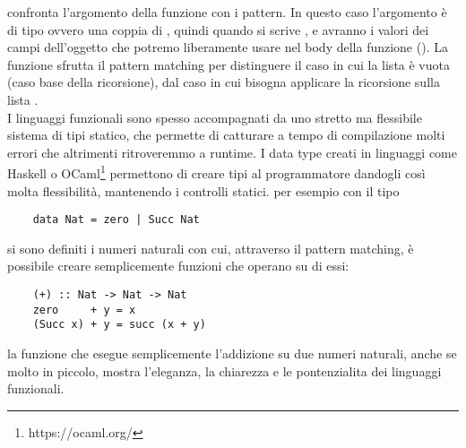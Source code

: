  confronta l'argomento della funzione con i pattern. In questo caso l'argomento è di tipo  ovvero
una coppia di , quindi quando si scrive ,  e  avranno i valori dei campi dell'oggetto 
che potremo liberamente usare nel body della funzione ().
La funzione  sfrutta il pattern matching per distinguere il caso in cui la lista è vuota  (caso base della ricorsione), dal caso in cui
bisogna applicare la ricorsione sulla lista . 
\\I linguaggi funzionali sono spesso accompagnati da uno stretto ma flessibile sistema di tipi statico, che permette di catturare a tempo di compilazione molti errori che altrimenti ritroveremmo a runtime. I data type creati in linguaggi come Haskell o OCaml\footnote{https://ocaml.org/}
permettono di creare tipi al programmatore dandogli così molta flessibilità, mantenendo i controlli statici. per esempio con il tipo 
\begin{verbatim}
	data Nat = zero | Succ Nat
\end{verbatim}
si sono definiti i numeri naturali con cui, attraverso il pattern matching, è possibile creare semplicemente funzioni che operano su di essi:
\begin{verbatim}
	(+) :: Nat -> Nat -> Nat
	zero     + y = x
	(Succ x) + y = succ (x + y) 
\end{verbatim}
la funzione \code{(+)} che esegue semplicemente l'addizione su due numeri naturali, anche se molto in piccolo, mostra l'eleganza, la chiarezza e le pontenzialita dei linguaggi funzionali.

